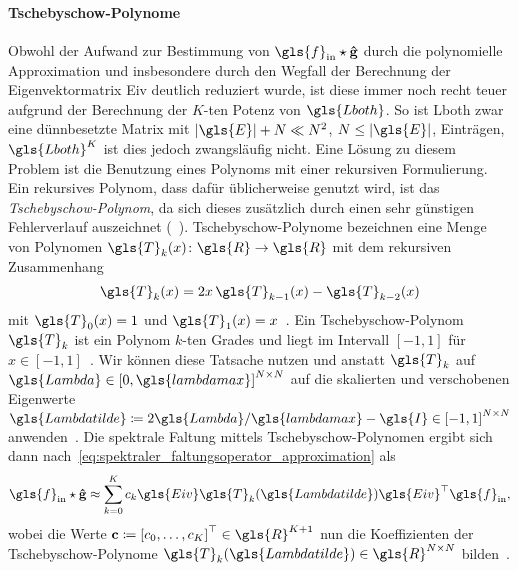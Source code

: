 \paragraph{Tschebyschow-Polynome}
\label{tschebyschow_polynome}

Obwohl der Aufwand zur Bestimmung von $\gls{f}_{\mathrm{in}} \star \ve{\hat g}$ durch die polynomielle Approximation und insbesondere durch den Wegfall der Berechnung der Eigenvektormatrix \gls{Eiv} deutlich reduziert wurde, ist diese immer noch recht teuer aufgrund der Berechnung der $K$-ten Potenz von $\gls{Lboth}$.
So ist \gls{Lboth} zwar eine dünnbesetzte Matrix mit $\left|\gls{E}\right| + N \ll N^2$, $N \leq \left|\gls{E}\right|$, Einträgen, $\gls{Lboth}^K$ ist dies jedoch zwangsläufig nicht.
Eine Lösung zu diesem Problem ist die Benutzung eines Polynoms mit einer rekursiven Formulierung.
Ein rekursives Polynom, dass dafür üblicherweise genutzt wird, ist das \emph{Tschebyschow-Polynom}, da sich dieses zusätzlich durch einen sehr günstigen Fehlerverlauf auszeichnet (\vgl{}~\cite{Hammond}).
Tschebyschow-Polynome bezeichnen eine Menge von Polynomen $\gls{T}_k\left(x\right) \colon \gls{R} \to \gls{R}$ mit dem rekursiven Zusammenhang
\begin{equation*}
  \gls{T}_k\left(x\right) = 2x\, \gls{T}_{k-1}\left(x\right) - \gls{T}_{k-2}\left(x\right)
\end{equation*}
mit $\gls{T}_0\left(x\right) = 1$ und $\gls{T}_1\left(x\right) = x$~\cite{Hammond}.
Ein Tschebyschow-Polynom $\gls{T}_k$ ist ein Polynom $k$-ten Grades und liegt im Intervall $\left[-1, 1\right]$ für $x \in \left[-1, 1\right]$~\cite{Hammond}.
Wir können diese Tatsache nutzen und anstatt $\gls{T}_k$ auf $\gls{Lambda} \in {\left[0, \gls{lambdamax}\right]}^{N \times N}$ auf die skalierten und verschobenen Eigenwerte $\gls{Lambdatilde} \coloneqq 2\gls{Lambda}/\gls{lambdamax} - \gls{I} \in {\left[-1, 1\right]}^{N \times N}$ anwenden~\cite{Defferrard}.
Die spektrale Faltung mittels Tschebyschow-Polynomen ergibt sich dann nach~\eqref{eq:spektraler_faltungsoperator_approximation} als
\begin{equation}
  \gls{f}_{\mathrm{in}} \star \ve{\hat g} \approx \sum_{k=0}^K c_k\gls{Eiv}\gls{T}_k\left(\gls{Lambdatilde}\right)\gls{Eiv}^{\top}\gls{f}_{\mathrm{in}},
  \label{eq:tschebyschow_faltung}
\end{equation}
wobei die Werte $\ve{c} \coloneqq {\left[c_0, \ldots, c_K\right]}^{\top} \in \gls{R}^{K+1}$ nun die Koeffizienten der Tschebyschow-Po\-ly\-no\-me $\gls{T}_k\left(\gls{Lambdatilde}\right) \in \gls{R}^{N \times N}$ bilden~\cite{Defferrard}.

